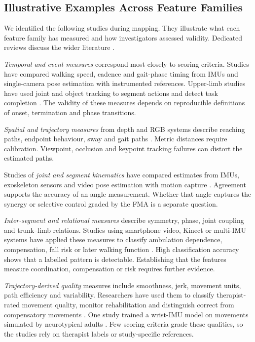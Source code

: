 \documentclass[11pt]{article}
\begin{document}
\subsection{Illustrative Examples Across Feature Families}
We identified the following studies during mapping. They illustrate what each feature family has measured and how investigators assessed validity. Dedicated reviews discuss the wider literature \cite{S3Luvizutto202234115576,Senadheera2024AIStrokeScoping,Nicora2025AIRoboticRehab}.

\emph{Temporal and event measures} correspond most closely to scoring criteria. Studies have compared walking speed, cadence and gait-phase timing from IMUs and single-camera pose estimation with instrumented references. Upper-limb studies have used joint and object tracking to segment actions and detect task completion \cite{Yang2013SpatiotemporalGait,S3Lonini202235224426,S3Stenum202438530801,Ahmed2021AutomatedMovement}. The validity of these measures depends on reproducible definitions of onset, termination and phase transitions.

\emph{Spatial and trajectory measures} from depth and RGB systems describe reaching paths, endpoint behaviour, sway and gait paths \cite{Scano2018KinectReaching,Proffitt2023DepthMovement,Zamin2023BIONICS,S3Stenum202438530801}. Metric distances require calibration. Viewpoint, occlusion and keypoint tracking failures can distort the estimated paths.

Studies of \emph{joint and segment kinematics} have compared estimates from IMUs, exoskeleton sensors and video pose estimation with motion capture \cite{Held2018UpperLimbIMU,Grimm2021KinematicValidation,Formstone2021IMUMMG,S3John202437682075}. Agreement supports the accuracy of an angle measurement. Whether that angle captures the synergy or selective control graded by the FMA is a separate question.

\emph{Inter-segment and relational measures} describe symmetry, phase, joint coupling and trunk--limb relations. Studies using smartphone video, Kinect or multi-IMU systems have applied these measures to classify ambulation dependence, compensation, fall risk or later walking function \cite{Lee2021SmartphoneVideoAmbulation,Zhi2018CompensationDetection,S3Abdollahi202438339529,S3OBrien202236304845}. High classification accuracy shows that a labelled pattern is detectable. Establishing that the features measure coordination, compensation or risk requires further evidence.

\emph{Trajectory-derived quality} measures include smoothness, jerk, movement units, path efficiency and variability. Researchers have used them to classify therapist-rated movement quality, monitor rehabilitation and distinguish correct from compensatory movements \cite{Jung2017MovementQuality,Lu2021MotionFeaturesProgress,Proffitt2023DepthMovement,Lin2019ManualDexterity,Seo2024WearableQuality}. One study trained a wrist-IMU model on movements simulated by neurotypical adults \cite{Li2023DeepLearningTaskPractice}. Few scoring criteria grade these qualities, so the studies rely on therapist labels or study-specific references.
\end{document}
